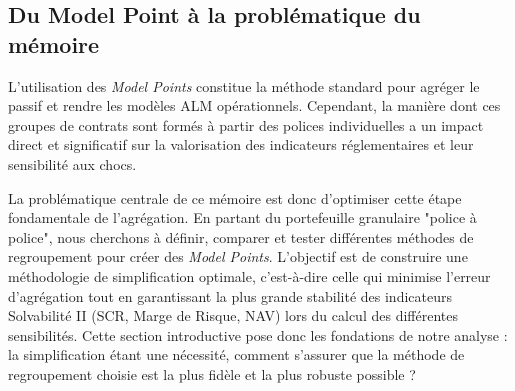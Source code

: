 \subsection{Du Model Point à la problématique du mémoire}

L'utilisation des \textit{Model Points} constitue la méthode standard pour agréger le passif et rendre les modèles ALM opérationnels. Cependant, la manière dont ces groupes de contrats sont formés à partir des polices individuelles a un impact direct et significatif sur la valorisation des indicateurs réglementaires et leur sensibilité aux chocs.

\bigskip

La problématique centrale de ce mémoire est donc d'optimiser cette étape fondamentale de l'agrégation. En partant du portefeuille granulaire "police à police", nous cherchons à définir, comparer et tester différentes méthodes de regroupement pour créer des \textit{Model Points}. L'objectif est de construire une méthodologie de simplification optimale, c'est-à-dire celle qui minimise l'erreur d'agrégation tout en garantissant la plus grande stabilité des indicateurs Solvabilité II (SCR, Marge de Risque, NAV) lors du calcul des différentes sensibilités. Cette section introductive pose donc les fondations de notre analyse : la simplification étant une nécessité, comment s'assurer que la méthode de regroupement choisie est la plus fidèle et la plus robuste possible ?
